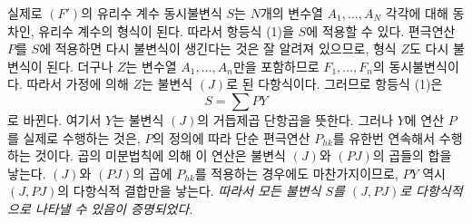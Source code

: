 
실제로 $(F')$의 유리수 계수 동시불변식 $S$는 $N$개의 변수열 $A_1,\ldots,A_N$ 각각에 대해 동차인, 유리수 계수의 형식이 된다. 따라서 항등식 (1)을 $S$에 적용할 수 있다. 편극연산 $P$를 $S$에 적용하면 다시 불변식이 생긴다는 것은 잘 알려져 있으므로, 형식 $Z$도 다시 불변식이 된다. 더구나 $Z$는 변수열 $A_1,
\ldots,A_n$만을 포함하므로 $F_1,
\ldots,F_n$의 동시불변식이다. 따라서 가정에 의해 $Z$는 불변식 $(J)$로 된 다항식이다. 그러므로 항등식 (1)은
\[
  S=\sum PY
\]
로 바뀐다. 여기서 $Y$는 불변식 $(J)$의 거듭제곱 단항곱을 뜻한다. 그러나 $Y$에 연산 $P$를 실제로 수행하는 것은, $P$의 정의에 따라 단순 편극연산 $P_{hk}$를 유한번 연속해서 수행하는 것이다. 곱의 미분법칙에 의해 이 연산은 불변식 $(J)$와 $(PJ)$의 곱들의 합을 낳는다. $(J)$와 $(PJ)$의 곱에 $P_{hk}$를 적용하는 경우에도 마찬가지이므로, $PY$ 역시 $(J,PJ)$의 다항식적 결합만을 낳는다. \emph{따라서 모든 불변식 $S$를 $(J,PJ)$로 다항식적으로 나타낼 수 있음이 증명되었다.}
